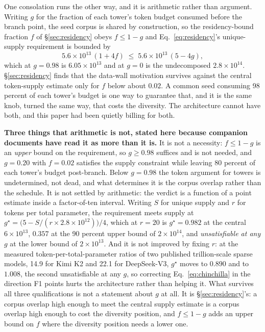 \documentclass[11pt]{article}
\begin{document}
One consolation runs the other way, and it is arithmetic rather than argument. Writing $g$ for the fraction of each tower's token budget consumed before the branch point, the seed corpus is shared by construction, so the residency-bound fraction $f$ of \S\ref{sec:residency} obeys $f \leq 1-g$ and Eq.~\eqref{eq:residency}'s unique-supply requirement is bounded by
\[
5.6\times10^{13}\,(1+4f) \;\leq\; 5.6\times10^{13}\,(5-4g),
\]
which at $g = 0.98$ is $6.05\times10^{13}$ and at $g=0$ is the undecomposed $2.8\times10^{14}$. \S\ref{sec:residency} finds that the data-wall motivation survives against the central token-supply estimate only for $f$ below about $0.02$. A common seed consuming 98 percent of each tower's budget is one way to guarantee that, and it is the same knob, turned the same way, that costs the diversity. The architecture cannot have both, and this paper had been quietly billing for both.

\textbf{Three things that arithmetic is not, stated here because companion documents have read it as more than it is.} It is not a necessity: $f \leq 1-g$ is an \emph{upper} bound on the requirement, so $g \geq 0.98$ suffices and is not needed, and $g = 0.20$ with $f = 0.02$ satisfies the supply constraint while leaving 80 percent of each tower's budget post-branch. Below $g = 0.98$ the token argument for towers is undetermined, not dead, and what determines it is the corpus overlap rather than the schedule. It is not settled by arithmetic: the verdict is a function of a point estimate inside a factor-of-ten interval. Writing $S$ for unique supply and $r$ for tokens per total parameter, the requirement meets supply at $g^\star = \bigl(5 - S/(r \times 2.8\times10^{12})\bigr)/4$, which at $r=20$ is $g^\star = 0.982$ at the central $6\times10^{13}$, $0.357$ at the 90 percent upper bound of $2\times10^{14}$, and \emph{unsatisfiable at any $g$} at the lower bound of $2\times10^{13}$. And it is not improved by fixing $r$: at the measured token-per-total-parameter ratios of two published trillion-scale sparse models, 14.9 for Kimi K2 and 22.1 for DeepSeek-V3, $g^\star$ moves to $0.890$ and to $1.008$, the second unsatisfiable at any $g$, so correcting Eq.~\eqref{eq:chinchilla} in the direction F1 points hurts the architecture rather than helping it. What survives all three qualifications is not a statement about $g$ at all. It is \S\ref{sec:residency}'s: a corpus overlap high enough to meet the central supply estimate is a corpus overlap high enough to cost the diversity position, and $f \leq 1-g$ adds an upper bound on $f$ where the diversity position needs a lower one.
\end{document}
